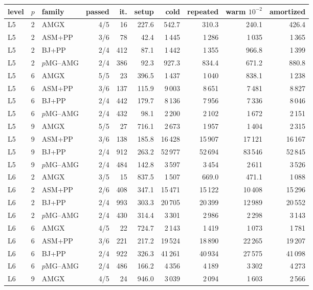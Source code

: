 \begin{tabular}{lrlrrrrrrr}
\toprule
level & $p$ & family & passed & it. & setup & cold & repeated & warm $10^{-2}$ & amortized\\
\midrule
L5 & 2 & AMGX & 4/5 & 16 & 227.6 & 542.7 & 310.3 & 240.1 & 426.4\\
L5 & 2 & ASM+PP & 3/6 & 78 & 42.4 & 1\,445 & 1\,286 & 1\,035 & 1\,365\\
L5 & 2 & BJ+PP & 2/4 & 412 & 87.1 & 1\,442 & 1\,355 & 966.8 & 1\,399\\
L5 & 2 & $p$MG--AMG & 2/4 & 386 & 92.3 & 927.3 & 834.4 & 671.2 & 880.8\\
L5 & 6 & AMGX & 5/5 & 23 & 396.5 & 1\,437 & 1\,040 & 838.1 & 1\,238\\
L5 & 6 & ASM+PP & 3/6 & 137 & 115.9 & 9\,003 & 8\,651 & 7\,481 & 8\,827\\
L5 & 6 & BJ+PP & 2/4 & 442 & 179.7 & 8\,136 & 7\,956 & 7\,336 & 8\,046\\
L5 & 6 & $p$MG--AMG & 2/4 & 432 & 98.1 & 2\,200 & 2\,102 & 1\,672 & 2\,151\\
L5 & 9 & AMGX & 5/5 & 27 & 716.1 & 2\,673 & 1\,957 & 1\,404 & 2\,315\\
L5 & 9 & ASM+PP & 3/6 & 138 & 185.8 & 16\,428 & 15\,907 & 17\,121 & 16\,167\\
L5 & 9 & BJ+PP & 2/4 & 912 & 263.2 & 52\,977 & 52\,694 & 83\,546 & 52\,845\\
L5 & 9 & $p$MG--AMG & 2/4 & 484 & 142.8 & 3\,597 & 3\,454 & 2\,611 & 3\,526\\
L6 & 2 & AMGX & 3/5 & 15 & 837.5 & 1\,507 & 669.0 & 471.1 & 1\,088\\
L6 & 2 & ASM+PP & 2/6 & 408 & 347.1 & 15\,471 & 15\,122 & 10\,408 & 15\,296\\
L6 & 2 & BJ+PP & 2/4 & 993 & 303.3 & 20\,705 & 20\,399 & 12\,989 & 20\,552\\
L6 & 2 & $p$MG--AMG & 2/4 & 430 & 314.4 & 3\,301 & 2\,986 & 2\,298 & 3\,143\\
L6 & 6 & AMGX & 4/5 & 22 & 724.7 & 2\,143 & 1\,419 & 1\,073 & 1\,781\\
L6 & 6 & ASM+PP & 3/6 & 221 & 217.2 & 19\,524 & 18\,890 & 22\,265 & 19\,207\\
L6 & 6 & BJ+PP & 2/4 & 922 & 326.3 & 41\,261 & 40\,934 & 27\,575 & 41\,098\\
L6 & 6 & $p$MG--AMG & 2/4 & 486 & 166.2 & 4\,356 & 4\,189 & 3\,302 & 4\,273\\
L6 & 9 & AMGX & 4/5 & 24 & 946.0 & 3\,039 & 2\,094 & 1\,603 & 2\,566\\

\end{tabular}

